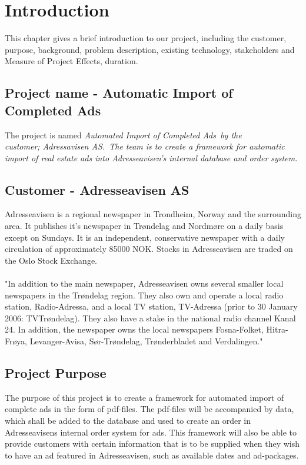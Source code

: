 \section{Introduction}
This chapter gives a brief introduction to our project, including the customer, purpose, background, problem description, existing technology, stakeholders and Measure of Project Effects, duration. 
\newpage

\subsection{Project name - Automatic Import of Completed Ads}
The project is named \em Automated Import of Completed Ads\em \ by the \\
customer; \em Adressavisen AS.\em \ The team is to create a framework for automatic import of real estate ads into Adresseavisen's internal database and order system.
\subsection{Customer - Adresseavisen AS}
Adresseavisen is a regional newspaper in Trondheim, Norway and the surrounding area. It publishes it's newspaper in Trøndelag and Nordmøre on a daily basis except on Sundays. It is an independent, conservative newspaper with a daily circulation of approximately 85000 NOK. 
Stocks in Adresseavisen are traded on the Oslo Stock Exchange.\\
\\
"In addition to the main newspaper, Adresseavisen owns several smaller local newspapers in the Trøndelag region. They also own and operate a local radio station, Radio-Adressa, and a local TV station, TV-Adressa (prior to 30 January 2006: TVTrøndelag). They also have a stake in the national radio channel Kanal 24. In addition, the newspaper owns the local newspapers Fosna-Folket, Hitra-Frøya, Levanger-Avisa, Sør-Trøndelag, Trønderbladet and Verdalingen." \cite{adressaWiki}

\subsection{Project Purpose}
The purpose of this project is to create a framework for automated import of complete ads in the form of pdf-files. The pdf-files will be accompanied by data, which shall be added to the database and used to create an order in Adresseavisens internal order system for ads. This framework will also be able to provide customers with certain information that is to be supplied when they wish to have an ad featured in Adresseavisen, such as available dates and ad-packages.

